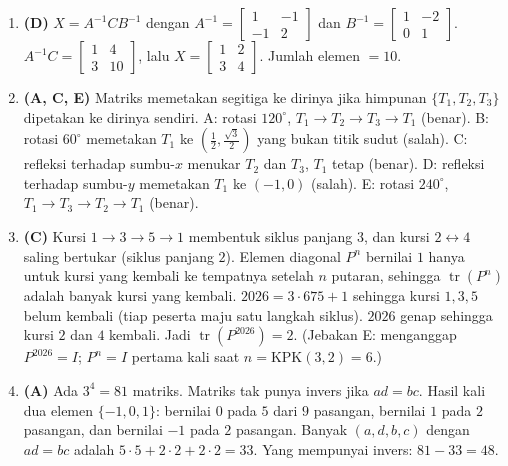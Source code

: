 \documentclass[a4paper,11pt]{article}
\newcommand{\tr}{\operatorname{tr}}
\begin{document}
\begin{enumerate}[leftmargin=2em,itemsep=2pt,topsep=2pt]
\item[\textbf{15.}] \textbf{(D)} $X=A^{-1}CB^{-1}$ dengan $A^{-1}=\begin{bmatrix}1&-1\\-1&2\end{bmatrix}$ dan $B^{-1}=\begin{bmatrix}1&-2\\0&1\end{bmatrix}$. $A^{-1}C=\begin{bmatrix}1&4\\3&10\end{bmatrix}$, lalu $X=\begin{bmatrix}1&2\\3&4\end{bmatrix}$. Jumlah elemen $=10$.
\item[\textbf{16.}] \textbf{(A, C, E)} Matriks memetakan segitiga ke dirinya jika himpunan $\{T_1,T_2,T_3\}$ dipetakan ke dirinya sendiri. A: rotasi $120^\circ$, $T_1\to T_2\to T_3\to T_1$ (benar). B: rotasi $60^\circ$ memetakan $T_1$ ke $\left(\frac12,\frac{\sqrt3}{2}\right)$ yang bukan titik sudut (salah). C: refleksi terhadap sumbu-$x$ menukar $T_2$ dan $T_3$, $T_1$ tetap (benar). D: refleksi terhadap sumbu-$y$ memetakan $T_1$ ke $(-1,0)$ (salah). E: rotasi $240^\circ$, $T_1\to T_3\to T_2\to T_1$ (benar).
\item[\textbf{17.}] \textbf{(C)} Kursi $1\to3\to5\to1$ membentuk siklus panjang $3$, dan kursi $2\leftrightarrow4$ saling bertukar (siklus panjang $2$). Elemen diagonal $P^{n}$ bernilai $1$ hanya untuk kursi yang kembali ke tempatnya setelah $n$ putaran, sehingga $\tr(P^{n})$ adalah banyak kursi yang kembali. $2026=3\cdot675+1$ sehingga kursi $1,3,5$ belum kembali (tiap peserta maju satu langkah siklus). $2026$ genap sehingga kursi $2$ dan $4$ kembali. Jadi $\tr(P^{2026})=2$. (Jebakan E: menganggap $P^{2026}=I$; $P^{n}=I$ pertama kali saat $n=\mathrm{KPK}(3,2)=6$.)
\item[\textbf{18.}] \textbf{(A)} Ada $3^4=81$ matriks. Matriks tak punya invers jika $ad=bc$. Hasil kali dua elemen $\{-1,0,1\}$: bernilai $0$ pada $5$ dari $9$ pasangan, bernilai $1$ pada $2$ pasangan, dan bernilai $-1$ pada $2$ pasangan. Banyak $(a,d,b,c)$ dengan $ad=bc$ adalah $5\cdot5+2\cdot2+2\cdot2=33$. Yang mempunyai invers: $81-33=48$.

\end{enumerate}
\end{document}
